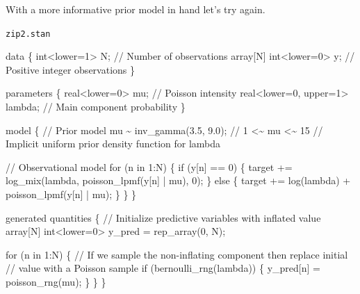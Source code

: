 \documentclass[
  letterpaper,
  DIV=11,
  numbers=noendperiod]{scrartcl}
\newenvironment{Shaded}{\begin{snugshade}}{\end{snugshade}}
\newcommand{\CommentTok}[1]{\textcolor[rgb]{0.37,0.37,0.37}{#1}}
\newcommand{\ControlFlowTok}[1]{\textcolor[rgb]{0.00,0.23,0.31}{#1}}
\newcommand{\DataTypeTok}[1]{\textcolor[rgb]{0.68,0.00,0.00}{#1}}
\newcommand{\DecValTok}[1]{\textcolor[rgb]{0.68,0.00,0.00}{#1}}
\newcommand{\FloatTok}[1]{\textcolor[rgb]{0.68,0.00,0.00}{#1}}
\newcommand{\KeywordTok}[1]{\textcolor[rgb]{0.00,0.23,0.31}{#1}}
\newcommand{\NormalTok}[1]{\textcolor[rgb]{0.00,0.23,0.31}{#1}}
\begin{document}
With a more informative prior model in hand let's try again.

\begin{codelisting}

\caption{\texttt{zip2.stan}}

\begin{Shaded}
\begin{Highlighting}[]
\KeywordTok{data}\NormalTok{ \{}
  \DataTypeTok{int}\NormalTok{\textless{}}\KeywordTok{lower}\NormalTok{=}\DecValTok{1}\NormalTok{\textgreater{} N;          }\CommentTok{// Number of observations}
  \DataTypeTok{array}\NormalTok{[N] }\DataTypeTok{int}\NormalTok{\textless{}}\KeywordTok{lower}\NormalTok{=}\DecValTok{0}\NormalTok{\textgreater{} y; }\CommentTok{// Positive integer observations}
\NormalTok{\}}

\KeywordTok{parameters}\NormalTok{ \{}
  \DataTypeTok{real}\NormalTok{\textless{}}\KeywordTok{lower}\NormalTok{=}\DecValTok{0}\NormalTok{\textgreater{} mu;              }\CommentTok{// Poisson intensity}
  \DataTypeTok{real}\NormalTok{\textless{}}\KeywordTok{lower}\NormalTok{=}\DecValTok{0}\NormalTok{, }\KeywordTok{upper}\NormalTok{=}\DecValTok{1}\NormalTok{\textgreater{} lambda; }\CommentTok{// Main component probability}
\NormalTok{\}}

\KeywordTok{model}\NormalTok{ \{}
  \CommentTok{// Prior model}
\NormalTok{  mu \textasciitilde{} inv\_gamma(}\FloatTok{3.5}\NormalTok{, }\FloatTok{9.0}\NormalTok{); }\CommentTok{// 1   \textless{}\textasciitilde{}   mu   \textless{}\textasciitilde{} 15}
  \CommentTok{// Implicit uniform prior density function for lambda}

  \CommentTok{// Observational model}
  \ControlFlowTok{for}\NormalTok{ (n }\ControlFlowTok{in} \DecValTok{1}\NormalTok{:N) \{}
    \ControlFlowTok{if}\NormalTok{ (y[n] == }\DecValTok{0}\NormalTok{) \{}
      \KeywordTok{target +=}\NormalTok{ log\_mix(lambda, poisson\_lpmf(y[n] | mu), }\DecValTok{0}\NormalTok{);}
\NormalTok{    \} }\ControlFlowTok{else}\NormalTok{ \{}
      \KeywordTok{target +=}\NormalTok{ log(lambda) + poisson\_lpmf(y[n] | mu);}
\NormalTok{    \}}
\NormalTok{  \}}
\NormalTok{\}}

\KeywordTok{generated quantities}\NormalTok{ \{}
  \CommentTok{// Initialize predictive variables with inflated value}
  \DataTypeTok{array}\NormalTok{[N] }\DataTypeTok{int}\NormalTok{\textless{}}\KeywordTok{lower}\NormalTok{=}\DecValTok{0}\NormalTok{\textgreater{} y\_pred = rep\_array(}\DecValTok{0}\NormalTok{, N);}

  \ControlFlowTok{for}\NormalTok{ (n }\ControlFlowTok{in} \DecValTok{1}\NormalTok{:N) \{}
    \CommentTok{// If we sample the non{-}inflating component then replace initial}
    \CommentTok{// value with a Poisson sample}
    \ControlFlowTok{if}\NormalTok{ (bernoulli\_rng(lambda)) \{}
\NormalTok{      y\_pred[n] = poisson\_rng(mu);}
\NormalTok{    \}}
\NormalTok{  \}}
\NormalTok{\}}
\end{Highlighting}
\end{Shaded}

\end{codelisting}
\end{document}
